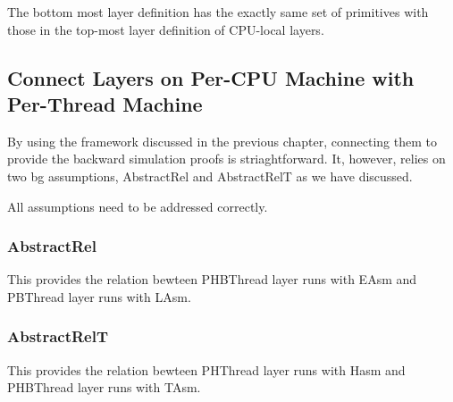 The bottom most layer definition has the exactly same set of primitives with those in 
the top-most layer definition of CPU-local layers. 

\subsection{Connect Layers on Per-CPU Machine with Per-Thread Machine}
\label{chapter:certikos:subsec:multithreaded-connect}

By using the framework discussed in the previous chapter, connecting them to provide the backward simulation proofs is striaghtforward.
It, however, relies on two bg assumptions, 
AbstractRel and AbstractRelT as we have discussed. 

All assumptions need to be addressed correctly.

\subsubsection{AbstractRel}

This provides the relation bewteen PHBThread layer runs with EAsm and PBThread layer runs with LAsm. 

\subsubsection{AbstractRelT}

This provides the relation bewteen PHThread layer runs with Hasm and PHBThread layer runs with TAsm. 



